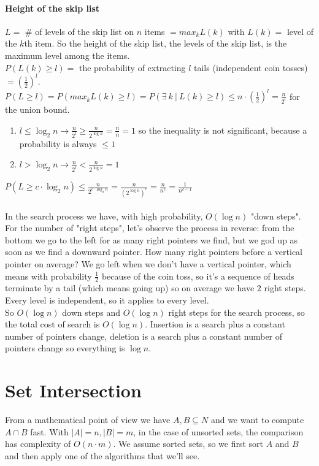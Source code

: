 \documentclass[10pt]{report}
\begin{document}
\paragraph{Height of the skip list} $L =$ \# of levels of the skip list on $n$ items $= max_k L(k)$ with $L(k) =$ level of the $k$th item. So the height of the skip list, the levels of the skip list, is the maximum level among the items.\\
$P(L(k) \geq l) = $ the probability of extracting $l$ tails (independent coin tosses) $= \left(\frac{1}{2}\right)^l$.\\
$P(L \geq l) = P(max_k L(k) \geq l) = P(\exists\: k\:|\: L(k) \geq l) \leq n\cdot\left(\frac{1}{2}\right)^l = \frac{n}{2^l}$ for the union bound.
\begin{enumerate}
	\item $l \leq \log_2 n \rightarrow \frac{n}{2^l} \geq \frac{n}{2^{\log n}} = \frac{n}{n} = 1$ so the inequality is not significant, because a probability is always $\leq 1$
	\item $l > \log_2 n \rightarrow \frac{n}{2^l} < \frac{n}{2^{\log n}} = 1$
\end{enumerate}
$P(L \geq c\cdot\log_2 n) \leq \frac{n}{2^{c\cdot\log_2 n}} = \frac{n}{(2^{\log n})^c} = \frac{n}{n^c} = \frac{1}{n^{c-1}}$\\\\
In the search process we have, with high probability, $O(\log n)$ "down steps". For the number of "right steps", let's observe the process in reverse: from the bottom we go to the left for as many right pointers we find, but we god up as soon as we find a downward pointer. How many right pointers before a vertical pointer on average? We go left when we don't have a vertical pointer, which means with probability $\frac{1}{2}$ because of the coin toss, so it's a sequence of heads terminate by a tail (which means going up) so on average we have $2$ right steps. Every level is independent, so it applies to every level.\\
So $O(\log n)$ down steps and $O(\log n)$ right steps for the search process, so the total cost of search is $O(\log n)$. Insertion is a search plus a constant number of pointers change, deletion is a search plus a constant number of pointers change so everything is $\log n$.
\section{Set Intersection}
From a mathematical point of view we have $A,B\subseteq N$ and we want to compute $A \cap B$ fast. With $|A| = n, |B| = m$, in the case of unsorted sets, the comparison has complexity of $O(n\cdot m)$. We assume sorted sets, so we first sort $A$ and $B$ and then apply one of the algorithms that we'll see.
\end{document}
